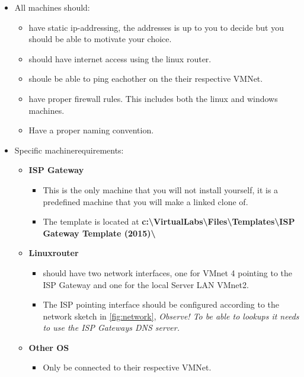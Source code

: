 \documentclass[paper=a4, fontsize=11pt]{report} %
\begin{document}
\begin{itemize}
    \item All machines should:
    \begin{itemize}
        \item have static ip-addressing, the addresses is up to you to decide but you should be able to motivate your choice. 
	\item should have internet access using the linux router.
	\item shoule be able to ping eachother on the their respective VMNet.
        \item have proper firewall rules. This includes both the linux and windows machines.
    	\item Have a proper naming convention.
    \end{itemize}
	\item Specific machinerequirements:
    \begin{itemize}
        \item \textbf{ISP Gateway}
        \begin{itemize}
		\item This is the only machine that you will not install yourself, it is a predefined machine that you will make a linked clone of.
        	\item The template is located at \textbf{c:\textbackslash VirtualLabs\textbackslash Files\textbackslash Templates\textbackslash ISP Gateway Template (2015)\textbackslash }
        \end{itemize}

        \item \textbf{Linuxrouter}
        \begin{itemize}
		\item should have two network interfaces, one for VMnet 4 pointing to the ISP Gateway and one for the local Server LAN VMnet2.
            	\item The ISP pointing interface should be configured according to the network sketch in \figurename \ref{fig:network}, \textit{Observe! To be able to lookups it needs to use the ISP Gateways DNS server.}
        \end{itemize}
        
        \item \textbf{Other OS}
        \begin{itemize}
		\item Only be connected to their respective VMNet.
        \end{itemize}
        
    \end{itemize}
\end{itemize}
\end{document}
